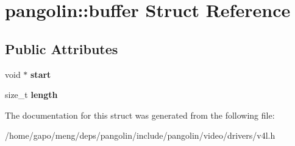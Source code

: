 \hypertarget{structpangolin_1_1buffer}{}\section{pangolin\+:\+:buffer Struct Reference}
\label{structpangolin_1_1buffer}
\subsection*{Public Attributes}
\begin{DoxyCompactItemize}
\item 
void $\ast$ {\bfseries start}\hypertarget{structpangolin_1_1buffer_abec86539d0c4f78804936b34ec1aa80f}{}\label{structpangolin_1_1buffer_abec86539d0c4f78804936b34ec1aa80f}

\item 
size\+\_\+t {\bfseries length}\hypertarget{structpangolin_1_1buffer_a8e7d9dba51b845aa86a9337ae7dd5945}{}\label{structpangolin_1_1buffer_a8e7d9dba51b845aa86a9337ae7dd5945}

\end{DoxyCompactItemize}


The documentation for this struct was generated from the following file\+:\begin{DoxyCompactItemize}
\item 
/home/gapo/meng/deps/pangolin/include/pangolin/video/drivers/v4l.\+h\end{DoxyCompactItemize}

